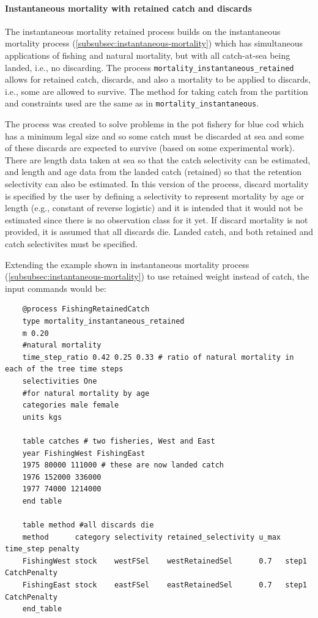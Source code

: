 \paragraph{Instantaneous mortality with retained catch and discards}\label{sec:inst-mort-retained}

The instantaneous mortality retained process builds on the instantaneous mortality process (\ref{subsubsec:instantaneous-mortality}) which has simultaneous applications of fishing and natural
mortality, but with all catch-at-sea being landed, i.e., no discarding. The process \texttt{mortality\_instantaneous\_retained} allows for retained catch, discards, and also a mortality to be applied to discards, i.e., some are allowed to survive. The method for taking catch from the partition and constraints used are the same as in \texttt{mortality\_instantaneous}.

The process was created to solve problems in the pot fishery for blue cod which has a minimum legal size and so some catch must be discarded at sea and some of these discards are expected to survive (based on some experimental work). There are length data taken at sea so that the catch selectivity can be estimated, and length and age data from the landed catch (retained) so that the retention selectivity can also be estimated. In this version of the process, discard mortality is specified by the user by defining a selectivity to represent mortality by age or length (e.g., constant of reverse logistic) and it is intended that it would not be estimated since there is no observation class for it yet. If discard mortality is not provided, it is assumed that all discards die. Landed catch, and both retained and catch selectivites must be specified.

Extending the example shown in instantaneous mortality process (\ref{subsubsec:instantaneous-mortality}) to use retained weight instead of catch, the input commands would be:

{\small{\begin{verbatim}
    @process FishingRetainedCatch
    type mortality_instantaneous_retained
    m 0.20
    #natural mortality
    time_step_ratio 0.42 0.25 0.33 # ratio of natural mortality in each of the tree time steps
    selectivities One
    #for natural mortality by age
    categories male female
    units kgs

    table catches # two fisheries, West and East
    year FishingWest FishingEast
    1975 80000 111000 # these are now landed catch
    1976 152000 336000
    1977 74000 1214000
    end table

    table method #all discards die
    method      category selectivity retained_selectivity u_max time_step penalty
    FishingWest stock    westFSel    westRetainedSel      0.7   step1     CatchPenalty
    FishingEast stock    eastFSel    eastRetainedSel      0.7   step1     CatchPenalty
    end_table
    \end{verbatim}}}

